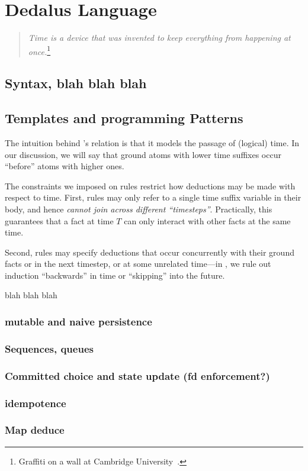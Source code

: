 \section{Dedalus Language}

\begin{quote}
%
\emph{Time is a device that was invented to keep everything from
happening at once.}\footnote{Graffiti on a wall at Cambridge
University~\cite{scheme}.}
%
\end{quote} 


\subsection{Syntax, blah  blah blah}

\subsection{Templates and programming Patterns}

The intuition behind \lang's  relation is that it models the
passage of (logical) time.  In our discussion, we will say that ground atoms
with lower time suffixes occur ``before'' atoms with higher ones.

The constraints we imposed on \slang rules restrict how deductions may be made
with respect to time.  First, rules may only refer to a single time suffix variable in
their body, and hence {\em cannot join across different ``timesteps''}.  Practically, this guarantees that a fact at time $T$ can only interact with other facts at the same time.

Second, rules may specify
deductions that occur concurrently with their ground facts or in the next
timestep, or at some unrelated time---in \lang, we rule out induction ``backwards'' in time or
``skipping'' into the future.

blah blah blah

\subsubsection{mutable and naive persistence}


\subsubsection{Sequences, queues}
\subsubsection{Committed choice and state update (fd enforcement?)}
\subsubsection{idempotence}
\subsubsection{Map deduce}
